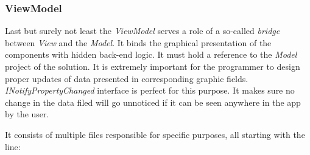     \subsubsection{ViewModel}  
        Last but surely not least the \textit{ViewModel} serves a role of a so-called \textit{bridge} between \textit{View} and the \textit{Model}. It binds the graphical presentation of the components with hidden back-end logic. It must hold a reference to the \textit{Model} project of the solution. It is extremely important for the programmer to design proper updates of data presented in corresponding graphic fields. \textit{INotifyPropertyChanged} interface is perfect for this purpose. It makes sure no change in the data filed will go unnoticed if it can be seen anywhere in the app by the user.
        
        It consists of multiple files responsible for specific purposes, all starting with the line:
        
